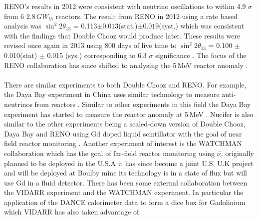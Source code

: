 RENO's results in 2012 were consistent with neutrino oscillations to within 4.9 $\sigma$ from 6 2.8\,$GW_{th}$ reactors. The result from RENO in 2012 using a rate based analysis was $\sin^2{2\theta_{13}}$ = 0.113$\pm0.013$(stat.)$\pm0.019$(syst.) which was consistent with the findings that Double Chooz would produce later. These results were revised once again in 2013 using 800 days of live time to $\sin^2{2\theta_{13}}$ = 0.100 $\pm$ 0.010(stat) $\pm$ 0.015 (sys.) corresponding to 6.3 $\sigma$ significance \cite{reno2013}. The focus of the RENO collaboration has since shifted to analysing the 5\,MeV reactor anomaly \cite{reno_may_2019}.  
\\\\There are similar experiments to both Double Chooz and RENO. For example, the Daya Bay experiment in China uses similar technology to measure anti-neutrinos from reactors \cite{DayaBay2007Precision}. Similar to other experiments in this field the Daya Bay experiment has started to measure the reactor anomaly at 5\,MeV \cite{Daya_Bay_2017}. Nucifer is also similar to the other experiments being a scaled-down version of Double Chooz, Daya Bay and RENO using Gd doped liquid scintillator with the goal of near field reactor monitoring \cite{nucifer2016}. Another experiment of interest is the WATCHMAN collaboration which has the goal of far-field reactor monitoring using $\bar{\nu_e}$ originally planned to be deployed in the U.S.A \cite{askins2015physics} it has since become a joint U.S, U.K project and will be deployed at Boulby mine \cite{burns2018remote} its technology is in a state of flux but will use Gd in a fluid detector. There has been some external collaboration between the VIDARR experiment and the WATCHMAN experiment. In particular the application of the DANCE calorimeter data to form a dice box for Gadolinium which VIDARR has also taken advantage of. %
